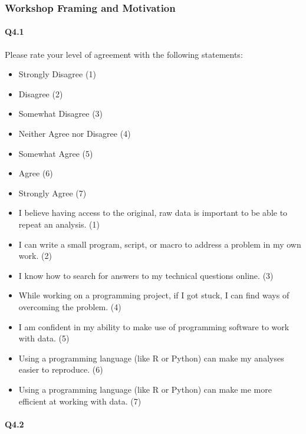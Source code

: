 \documentclass[030-workshop.tex]{subfiles}
\begin{document}
\subsubsection{Workshop Framing and Motivation}

    \paragraph{Q4.1}

    Please rate your level of agreement with the following statements:

    \begin{itemize}
        \item Strongly Disagree (1)
        \item Disagree (2)
        \item Somewhat Disagree (3)
        \item Neither Agree nor Disagree (4)
        \item Somewhat Agree (5)
        \item Agree (6)
        \item Strongly Agree (7)
    \end{itemize}

    \begin{itemize}
        \item I believe having access to the original, raw data is important to be able to repeat an analysis. (1)
        \item I can write a small program, script, or macro to address a problem in my own work. (2)
        \item I know how to search for answers to my technical questions online. (3)
        \item While working on a programming project, if I got stuck, I can find ways of overcoming the problem. (4)
        \item I am confident in my ability to make use of programming software to work with data. (5)
        \item Using a programming language (like R or Python) can make my analyses easier to reproduce. (6)
        \item Using a programming language (like R or Python) can make me more efficient at working with data. (7)
    \end{itemize}

    \paragraph{Q4.2}
\end{document}
